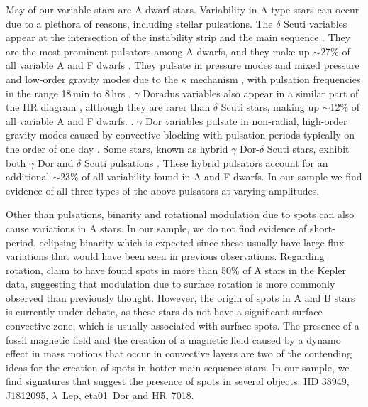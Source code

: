 \documentclass[twocolumn]{aastex631}
\begin{document}
May of our variable stars are A-dwarf stars.  Variability in A-type stars can occur due to a plethora of reasons, including stellar pulsations.  The $\delta$ Scuti variables appear at the intersection of the instability strip and the main sequence \citep[e.g.,][]{Petit1987}.  They are the most prominent pulsators among A dwarfs, and they make up $\sim$27\% of all variable A and F dwarfs \citep{Uytterhoeven2011}.   They pulsate in pressure modes and mixed pressure and low-order gravity modes due to the $\kappa$ mechanism \citep{Lee1985}, with pulsation frequencies in the range 18\,min to 8\,hrs \citep{Amado2004}. $\gamma$ Doradus variables also appear in a similar part of the HR diagram \citep[e.g.,][]{Kaye1999}, although they are rarer than $\delta$ Scuti stars, making up $\sim$12\% of all variable A and F dwarfs. \citep{Uytterhoeven2011}. $\gamma$ Dor variables pulsate in non-radial, high-order gravity modes caused by convective blocking \citep{Guzik2000} with pulsation periods typically on the order of one day \citep{Grigahcene2010}.  Some stars, known as hybrid $\gamma$ Dor-$\delta$ Scuti stars, exhibit both $\gamma$ Dor and $\delta$ Scuti pulsations \citep{Grigahcene2010}.  These hybrid pulsators account for an additional $\sim$23\% of all variability found in A and F dwarfs. In our sample we find evidence of all three types of the above pulsators at varying amplitudes.

Other than pulsations, binarity and rotational modulation due to spots can also cause variations in A stars. In our sample, we do not find evidence of short-period, eclipsing binarity which is expected since these usually have large flux variations that would have been seen in previous observations. Regarding rotation, \citet{Balona2013, Balona2017} claim to have found spots in more than 50\% of A stars in the Kepler data, suggesting that modulation due to surface rotation is more commonly observed than previously thought. However, the origin of spots in A and B stars is currently under debate, as these stars do not have a significant surface convective zone, which is usually associated with surface spots. The presence of a fossil magnetic field \citep{Parker1955} and the creation of a magnetic field caused by a dynamo effect in mass motions that occur in convective layers \citep{Charbonneau2014} are two of the contending ideas for the creation of spots in hotter main sequence stars. In our sample, we find signatures that suggest the presence of spots in several objects:  HD 38949, J1812095, $\lambda$~Lep, eta01~Dor and HR~7018.
\end{document}
